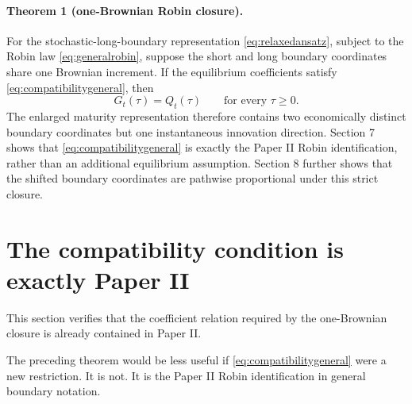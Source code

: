\documentclass[11pt]{article}
\numberwithin{equation}{section}
\begin{document}
\paragraph{Theorem 1 (one-Brownian Robin closure).}
For the stochastic-long-boundary representation \eqref{eq:relaxedansatz}, subject to the Robin law \eqref{eq:generalrobin}, suppose the short and long boundary coordinates share one Brownian increment. If the equilibrium coefficients satisfy \eqref{eq:compatibilitygeneral}, then
\begin{equation}
 G_t(\tau)=Q_t(\tau)\qquad\text{for every }\tau\geq0.
 \label{eq:identityalltau}
\end{equation}
The enlarged maturity representation therefore contains two economically distinct boundary coordinates but one instantaneous innovation direction. Section 7 shows that \eqref{eq:compatibilitygeneral} is exactly the Paper II Robin identification, rather than an additional equilibrium assumption. Section 8 further shows that the shifted boundary coordinates are pathwise proportional under this strict closure.

\section{The compatibility condition is exactly Paper II}

This section verifies that the coefficient relation required by the one-Brownian closure is already contained in Paper II.

The preceding theorem would be less useful if \eqref{eq:compatibilitygeneral} were a new restriction. It is not. It is the Paper II Robin identification in general boundary notation.
\end{document}
